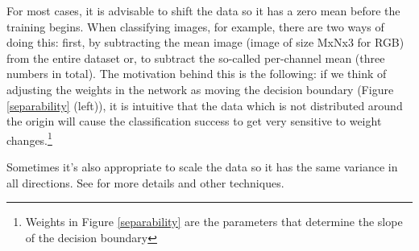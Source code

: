 For most cases, it is advisable to shift the data so it has a zero mean before the training begins. When classifying images, for example, there are two ways of doing this: first, by subtracting the mean image (image of size MxNx3 for RGB) from the entire dataset or, to subtract the so-called per-channel mean (three numbers in total). The motivation behind this is the following: if we think of adjusting the weights in the network as moving the decision boundary (Figure \ref{separability} (left)), it is intuitive that the data which is not distributed around the origin will cause the classification success to get very sensitive to weight changes.\footnote{Weights in Figure \ref{separability} are the parameters that determine the slope of the decision boundary}

Sometimes it's also appropriate to scale the data so it has the same variance in all directions. See \cite{mehlig} for more details and other techniques.